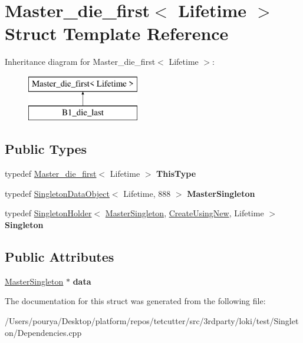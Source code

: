 \hypertarget{structMaster__die__first}{}\section{Master\+\_\+die\+\_\+first$<$ Lifetime $>$ Struct Template Reference}
\label{structMaster__die__first}
Inheritance diagram for Master\+\_\+die\+\_\+first$<$ Lifetime $>$\+:\begin{figure}[H]
\begin{center}
\leavevmode
\includegraphics[height=2.000000cm]{structMaster__die__first}
\end{center}
\end{figure}
\subsection*{Public Types}
\begin{DoxyCompactItemize}
\item 
\hypertarget{structMaster__die__first_a74f44ed67bab827b6570d8cac7dbd03e}{}typedef \hyperlink{structMaster__die__first}{Master\+\_\+die\+\_\+first}$<$ Lifetime $>$ {\bfseries This\+Type}\label{structMaster__die__first_a74f44ed67bab827b6570d8cac7dbd03e}

\item 
\hypertarget{structMaster__die__first_a64e6068161d77ad2a5b2b2cf70dd32c1}{}typedef \hyperlink{structSingletonDataObject}{Singleton\+Data\+Object}$<$ Lifetime, 888 $>$ {\bfseries Master\+Singleton}\label{structMaster__die__first_a64e6068161d77ad2a5b2b2cf70dd32c1}

\item 
\hypertarget{structMaster__die__first_a5157b2f7beb28732aba84ebc5f93c71f}{}typedef \hyperlink{classLoki_1_1SingletonHolder}{Singleton\+Holder}$<$ \hyperlink{structSingletonDataObject}{Master\+Singleton}, \hyperlink{structLoki_1_1CreateUsingNew}{Create\+Using\+New}, Lifetime $>$ {\bfseries Singleton}\label{structMaster__die__first_a5157b2f7beb28732aba84ebc5f93c71f}

\end{DoxyCompactItemize}
\subsection*{Public Attributes}
\begin{DoxyCompactItemize}
\item 
\hypertarget{structMaster__die__first_a795aa2f49e30406056f566e9b920f0d3}{}\hyperlink{structSingletonDataObject}{Master\+Singleton} $\ast$ {\bfseries data}\label{structMaster__die__first_a795aa2f49e30406056f566e9b920f0d3}

\end{DoxyCompactItemize}


The documentation for this struct was generated from the following file\+:\begin{DoxyCompactItemize}
\item 
/\+Users/pourya/\+Desktop/platform/repos/tetcutter/src/3rdparty/loki/test/\+Singleton/Dependencies.\+cpp\end{DoxyCompactItemize}
